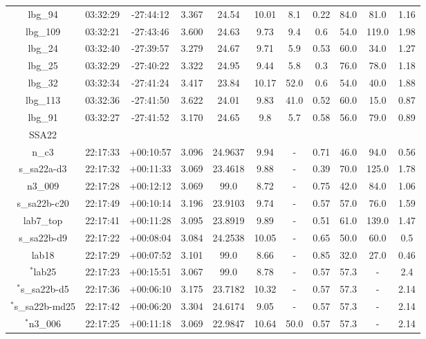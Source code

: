 \documentclass[fleqn,usenatbib]{mn2e}
\begin{document}
\begin{table*}
\begin{threeparttable}
\begin{tabular}{ccccccccccc}
lbg\_94         & 03:32:29 & -27:44:12 & 3.367       & 24.54  & 10.01 & 8.1  & 0.22        & 84.0        & 81.0    & 1.16      \\
lbg\_109        & 03:32:21 & -27:43:46 & 3.600       & 24.63  & 9.73  & 9.4  & 0.6         & 54.0        & 119.0   & 1.98      \\
lbg\_24         & 03:32:40 & -27:39:57 & 3.279       & 24.67  & 9.71  & 5.9  & 0.53        & 60.0        & 34.0    & 1.27      \\
lbg\_25         & 03:32:29 & -27:40:22 & 3.322        & 24.95  & 9.44  & 5.8  & 0.3         & 76.0        & 78.0    & 1.18      \\
lbg\_32         & 03:32:34 & -27:41:24 & 3.417      & 23.84  & 10.17 & 52.0 & 0.6         & 54.0        & 40.0    & 1.88      \\
lbg\_113        & 03:32:36 & -27:41:50 & 3.622      & 24.01  & 9.83  & 41.0 & 0.52        & 60.0        & 15.0    & 0.87      \\
lbg\_91         & 03:32:27 & -27:41:52 & 3.170       & 24.65  & 9.8   & 5.7  & 0.58        & 56.0        & 79.0    & 0.89 \\
 \hline
 SSA22 & & & & & & & & & & \\
 \hline
n\_c3         & 22:17:33 & +00:10:57 & 3.096       & 24.9637 & 9.94  & -            & 0.71        & 46.0        & 94.0    & 0.56      \\
s\_sa22a-d3   & 22:17:32 & +00:11:33 & 3.069 & 23.4618 & 9.88  & -            & 0.39        & 70.0        & 125.0   & 1.78      \\
n3\_009       & 22:17:28 & +00:12:12 & 3.069 & 99.0    & 8.72  & -            & 0.75        & 42.0        & 84.0    & 1.06      \\
s\_sa22b-c20  & 22:17:49 & +00:10:14 & 3.196     & 23.9103 & 9.74  & -            & 0.57        & 57.0        & 76.0    & 1.59      \\
lab7\_top     & 22:17:41 & +00:11:28 & 3.095      & 23.8919 & 9.89  & -            & 0.51        & 61.0        & 139.0   & 1.47 \\
s\_sa22b-d9   & 22:17:22 & +00:08:04 & 3.084    & 24.2538 & 10.05 & -            & 0.65        & 50.0        & 60.0    & 0.5       \\
lab18         & 22:17:29 & +00:07:52 & 3.101           & 99.0    & 8.66  & -            & 0.85        & 32.0        & 27.0    & 0.46      \\
$^{*}$lab25         & 22:17:23 & +00:15:51 & 3.067      & 99.0    & 8.78  & -            & 0.57         & 57.3        & -    & 2.4      \\
$^{*}$s\_sa22b-d5  & 22:17:36 & +00:06:10 & 3.175 & 23.7182 & 10.32 & -            & 0.57         & 57.3        & -    & 2.14      \\
$^{*}$s\_sa22b-md25 & 22:17:42 & +00:06:20 & 3.304     & 24.6174 & 9.05  & -            & 0.57         & 57.3        & -    & 2.14      \\
$^{*}$n3\_006       & 22:17:25 & +00:11:18 & 3.069     & 22.9847 & 10.64 & 50.0 & 0.57         & 57.3        & -    & 2.14      


\end{tabular}
\end{threeparttable}
\end{table*}
\end{document}
